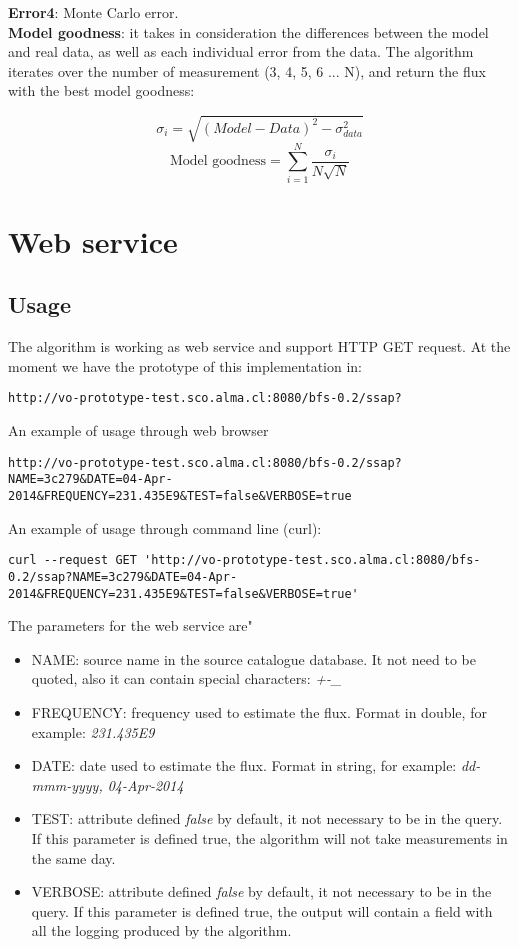 \documentclass[10pt]{article}
\begin{document}
\noindent \textbf{Error4}: Monte Carlo error. \\

\noindent \textbf{Model goodness}: it takes in consideration the differences
between the model and real data, as well as each individual error from the
data. The algorithm iterates over the number of measurement (3, 4, 5, 6 ... N),
and return the flux with the best model goodness:

$$ \sigma_i = \sqrt{ (Model - Data)^2 - \sigma_{data}^2 } $$
$$ \text{Model goodness} = \sum_{i=1}^{N}\frac{\sigma_i}{N\sqrt{N}} $$

\section{Web service}
\subsection{Usage}
The algorithm is working as web service and support HTTP GET request. At the moment we have the
prototype of this implementation in:

\begingroup
\fontsize{8pt}{10pt}\selectfont
\begin{verbatim}
http://vo-prototype-test.sco.alma.cl:8080/bfs-0.2/ssap?
\end{verbatim}
\endgroup

\noindent An example of usage through web browser
\begingroup
\fontsize{6pt}{10pt}\selectfont
\begin{verbatim}
http://vo-prototype-test.sco.alma.cl:8080/bfs-0.2/ssap?NAME=3c279&DATE=04-Apr-2014&FREQUENCY=231.435E9&TEST=false&VERBOSE=true
\end{verbatim}
\endgroup

\noindent An example of usage through command line (curl):
\begingroup
\fontsize{6pt}{10pt}\selectfont
\begin{verbatim}
curl --request GET 'http://vo-prototype-test.sco.alma.cl:8080/bfs-0.2/ssap?NAME=3c279&DATE=04-Apr-2014&FREQUENCY=231.435E9&TEST=false&VERBOSE=true'
\end{verbatim}
\endgroup

\noindent The parameters for the web service are"
\begin{itemize}
 \item NAME: source name in the source catalogue database. It not need to be quoted, also it can contain special characters: \emph{+-\_}
 \item FREQUENCY: frequency used to estimate the flux. Format in double, for example: \emph{231.435E9}
 \item DATE: date used to estimate the flux. Format in string, for example: \emph{dd-mmm-yyyy, 04-Apr-2014}
 \item TEST: attribute defined \emph{false} by default, it not necessary to be in the query. If this parameter is defined true, the algorithm will not take measurements in the same day.
 \item VERBOSE: attribute defined \emph{false} by default, it not necessary to be in the query. If this parameter is defined true, the output will contain a field with all the logging produced by the algorithm.
\end{itemize}
\end{document}
